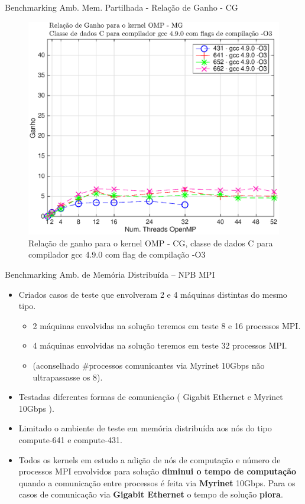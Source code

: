 \documentclass{beamer}
\begin{document}
  
     \begin{frame}{Benchmarking Amb. Mem. Partilhada  - {\small Relação de Ganho - CG}}

\begin{figure}[H]
\centering
\includegraphics[width=0.75\columnwidth]{EPS/OMP/ganho_mg_03.eps}
\caption{\tiny Relação de ganho para o kernel OMP - CG, classe de dados C para  compilador gcc 4.9.0 com flag de compilação -O3}
\label{ganho_omp}
\end{figure}

  \end{frame}
  
  \begin{frame}{Benchmarking Amb. de Memória Distribuída  -- NPB MPI}
\begin{itemize}
\item \small Criados casos de teste que envolveram 2 e 4 máquinas distintas do mesmo tipo.
\begin{itemize}
\item \small 2 máquinas envolvidas na solução teremos em teste 8 e 16 processos MPI.
\item \small 4 máquinas envolvidas na solução teremos em teste 32 processos MPI.
\item \tiny (aconselhado \#processos comunicantes via Myrinet 10Gbps não ultrapassasse os 8).
\end{itemize}
\item \small Testadas diferentes formas de comunicação ( Gigabit Ethernet e Myrinet 10Gbps ).
\item \small Limitado o ambiente de teste em memória distribuída aos nós do tipo compute-641 e compute-431.
\item \small Todos os kernels em estudo a adição de nós de computação e número de processos MPI envolvidos para solução \textbf{diminui o tempo de computação} quando a comunicação entre processos é feita via \textbf{Myrinet} 10Gbps. Para os casos de comunicação via \textbf{Gigabit Ethernet} o tempo de solução \textbf{piora}.
\end{itemize}
\end{frame}
  
\end{document}
